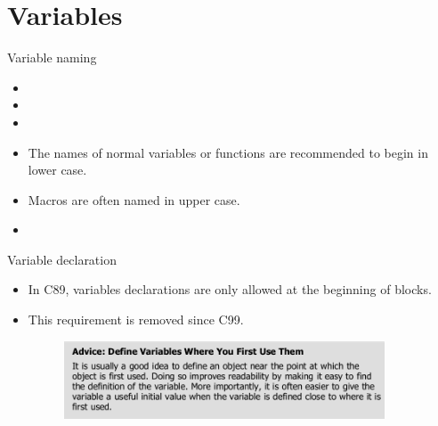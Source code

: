 \documentclass[handout]{beamer}
\begin{document}
\section{Variables}

\begin{frame}{Variable naming}
    \begin{itemize}
        \item {}
        \item {}
        \item {}
        \pause
        \item The names of normal variables or functions are recommended to begin in lower case.
        \item Macros are often named in upper case.
        \pause
        \item {}
    \end{itemize}
\end{frame}

\begin{frame}{Variable declaration}
    \begin{itemize}
        \item In C89, variables declarations are only allowed at the beginning of blocks.
        \item This requirement is removed since C99.
        \begin{figure}[h]
            \centering
            \includegraphics[width=0.9\textwidth]{figures/advice-variables.png}
        \end{figure}
    \end{itemize}
\end{frame}
\end{document}
